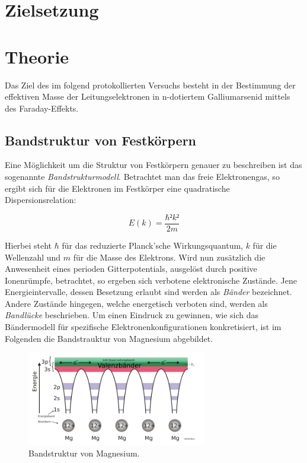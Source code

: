 


\section{Zielsetzung}
\label{sec:Theorie}

\section{Theorie}

Das Ziel des im folgend protokollierten Versuchs besteht in der Bestimmung der effektiven Masse der Leitungselektronen in 
n-dotiertem Galliumarsenid mittels des Faraday-Effekts. 

\subsection{Bandstruktur von Festkörpern}

\noindent Eine Möglichkeit um die Struktur von Festkörpern genauer zu beschreiben ist das sogenannte \textit{Bandstrukturmodell}. Betrachtet man das 
freie Elektronengas, so ergibt sich für die Elektronen im Festkörper eine quadratische Dispersionsrelation:

\begin{equation}
    E(k) = \frac{\hbar²{}k²}{2m}
\end{equation}

\noindent Hierbei steht $\hbar$ für das reduzierte Planck'sche Wirkungsquantum, $k$ für die Wellenzahl und $m$ für die Masse des Elektrons.
Wird nun zusätzlich die Anwesenheit eines perioden Gitterpotentials, ausgelöst durch positive Ionenrümpfe, betrachtet, so ergeben sich verbotene
elektronische Zustände. Jene Energieintervalle, dessen Besetzung erlaubt sind werden als \textit{Bänder} bezeichnet. Andere Zustände hingegen, welche
energetisch verboten sind, werden als \textit{Bandlücke} beschrieben. Um einen Eindruck zu gewinnen, wie sich das Bändermodell für spezifische
Elektronenkonfigurationen konkretisiert, ist im Folgenden die Bandstrauktur von Magnesium abgebildet. 

\begin{figure}[H]
    \centering
    \includegraphics[width=0.7\textwidth]{BandstrukturMagn.png}
    \caption{Bandstruktur von Magnesium.}
    \label{fig:Magnesium}
\end{figure}


